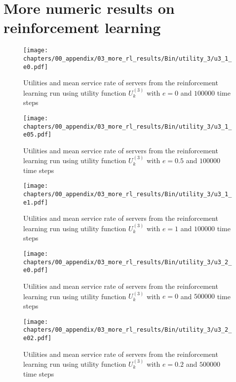 \chapter{More numeric results on reinforcement learning}
\label{appendix:reinforcement_learning}

\begin{figure}[H]
    \texttt{[image: chapters/00\_appendix/03\_more\_rl\_results/Bin/utility\_3/u3\_1\_e0.pdf]}
    \caption{Utilities and mean service rate of servers from the reinforcement
    learning run using utility function \(U_k^{(3)}\) with \(e = 0\) and
    \(100000\) time steps}
    \label{fig:RL_utility3_1_e0}
\end{figure}

\begin{figure}[H]
    \texttt{[image: chapters/00\_appendix/03\_more\_rl\_results/Bin/utility\_3/u3\_1\_e05.pdf]}
    \caption{Utilities and mean service rate of servers from the reinforcement
    learning run using utility function \(U_k^{(3)}\) with \(e = 0.5\) and
    \(100000\) time steps}
    \label{fig:RL_utility3_1_e05}
\end{figure}

\begin{figure}[H]
    \texttt{[image: chapters/00\_appendix/03\_more\_rl\_results/Bin/utility\_3/u3\_1\_e1.pdf]}
    \caption{Utilities and mean service rate of servers from the reinforcement
    learning run using utility function \(U_k^{(3)}\) with \(e = 1\) and
    \(100000\) time steps}
    \label{fig:RL_utility3_1_e1}
\end{figure}

\begin{figure}[H]
    \texttt{[image: chapters/00\_appendix/03\_more\_rl\_results/Bin/utility\_3/u3\_2\_e0.pdf]}
    \caption{Utilities and mean service rate of servers from the reinforcement
    learning run using utility function \(U_k^{(3)}\) with \(e = 0\) and
    \(500000\) time steps}
    \label{fig:RL_utility3_2_e0}
\end{figure}

\begin{figure}[H]
    \texttt{[image: chapters/00\_appendix/03\_more\_rl\_results/Bin/utility\_3/u3\_2\_e02.pdf]}
    \caption{Utilities and mean service rate of servers from the reinforcement
    learning run using utility function \(U_k^{(3)}\) with \(e = 0.2\) and
    \(500000\) time steps}
    \label{fig:RL_utility3_2_e02}
\end{figure}

